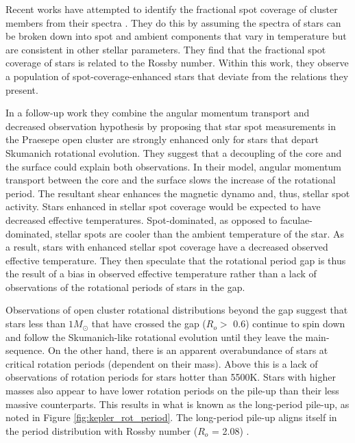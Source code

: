 Recent works have attempted to identify the fractional spot coverage of cluster members from their spectra \citep{cao_starspots_2022}.
They do this by assuming the spectra of stars can be broken down into spot and ambient components that vary in temperature but are consistent in other stellar parameters.
They find that the fractional spot coverage of stars is related to the Rossby number.
Within this work, they observe a population of spot-coverage-enhanced stars that deviate from the relations they present.

In a follow-up work \citep{cao_core-envelope_2023} they combine the angular momentum transport and decreased observation hypothesis by proposing that star spot measurements in the Praesepe open cluster are strongly enhanced only for stars that depart Skumanich rotational evolution.
They suggest that a decoupling of the core and the surface could explain both observations.
In their model, angular momentum transport between the core and the surface slows the increase of the rotational period. 
The resultant shear enhances the magnetic dynamo and, thus, stellar spot activity.
Stars enhanced in stellar spot coverage would be expected to have decreased effective temperatures.
Spot-dominated, as opposed to faculae-dominated, stellar spots are cooler than the ambient temperature of the star.
As a result, stars with enhanced stellar spot coverage have a decreased observed effective temperature.
They then speculate that the rotational period gap is thus the result of a bias in observed effective temperature rather than a lack of observations of the rotational periods of stars in the gap.

Observations of open cluster rotational distributions beyond the gap suggest that stars less than $1M_{\odot}$ that have crossed the gap ($R_o>\,\,$0.6) continue to spin down and follow the Skumanich-like rotational evolution until they leave the main-sequence.
On the other hand, there is an apparent overabundance of stars at critical rotation periods (dependent on their mass). 
Above this is a lack of observations of rotation periods for stars hotter than 5500K.
Stars with higher masses also appear to have lower rotation periods on the pile-up than their less massive counterparts.
This results in what is known as the long-period pile-up, as noted in Figure \ref{fig:kepler_rot_period}.
The long-period pile-up aligns itself in the \citet{mcquillan_rotation_2014} period distribution with Rossby number  ($R_o$ = 2.08) \citep{van_saders_forward_2019}.
 
